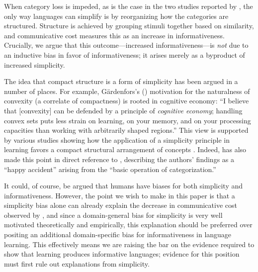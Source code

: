 \documentclass[doc,biblatex]{apa7}
\begin{document}
When category loss is impeded, as is the case in the two studies reported by \textcite{Carstensen:2015}, the only way languages can simplify is by reorganizing how the categories are structured. Structure is achieved by grouping stimuli together based on similarity, and communicative cost measures this as an increase in informativeness. Crucially, we argue that this outcome---increased informativeness---is \textit{not} due to an inductive bias in favor of informativeness; it arises merely as a byproduct of increased simplicity.

The idea that compact structure is a form of simplicity has been argued in a number of places. For example, G{\"a}rdenfors's (\citeyear[p.~70]{Gardenfors:2000}) motivation for the naturalness of convexity (a correlate of compactness) is rooted in cognitive economy: ``I believe that [convexity] can be defended by a principle of \textit{cognitive economy}; handling convex sets puts less strain on learning, on your memory, and on your processing capacities than working with arbitrarily shaped regions.'' This view is supported by various studies showing how the application of a simplicity principle in learning favors a compact structural arrangement of concepts \parencite{Pothos:2009,SteinertThrelkeld:2019,Sims:2018}. Indeed, \textcite[p.~457]{Richie:2016} has also made this point in direct reference to \textcite{Carstensen:2015}, describing the authors' findings as a ``happy accident'' arising from the ``basic operation of categorization.''

It could, of course, be argued that humans have biases for both simplicity and informativeness. However, the point we wish to make in this paper is that a simplicity bias alone can already explain the decrease in communicative cost observed by \textcite{Carstensen:2015}, and since a domain-general bias for simplicity is very well motivated theoretically and empirically, this explanation should be preferred over positing an additional domain-specific bias for informativeness in language learning. This effectively means we are raising the bar on the evidence required to show that learning produces informative languages; evidence for this position must first rule out explanations from simplicity.
\end{document}
